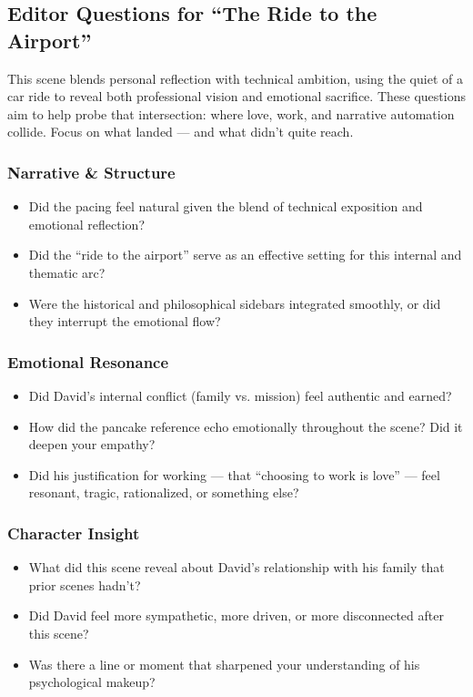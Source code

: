 \subsection*{Editor Questions for ``The Ride to the Airport''}

This scene blends personal reflection with technical ambition, using the quiet of a car ride to reveal both professional vision and emotional sacrifice. These questions aim to help probe that intersection: where love, work, and narrative automation collide. Focus on what landed — and what didn’t quite reach.

\subsubsection{Narrative \& Structure}

\begin{itemize}
  \item Did the pacing feel natural given the blend of technical exposition and emotional reflection?
  \item Did the “ride to the airport” serve as an effective setting for this internal and thematic arc?
  \item Were the historical and philosophical sidebars integrated smoothly, or did they interrupt the emotional flow?
\end{itemize}

\subsubsection{Emotional Resonance}

\begin{itemize}
  \item Did David’s internal conflict (family vs. mission) feel authentic and earned?
  \item How did the pancake reference echo emotionally throughout the scene? Did it deepen your empathy?
  \item Did his justification for working — that “choosing to work is love” — feel resonant, tragic, rationalized, or something else?
\end{itemize}

\subsubsection{Character Insight}

\begin{itemize}
  \item What did this scene reveal about David’s relationship with his family that prior scenes hadn’t?
  \item Did David feel more sympathetic, more driven, or more disconnected after this scene?
  \item Was there a line or moment that sharpened your understanding of his psychological makeup?
\end{itemize}

